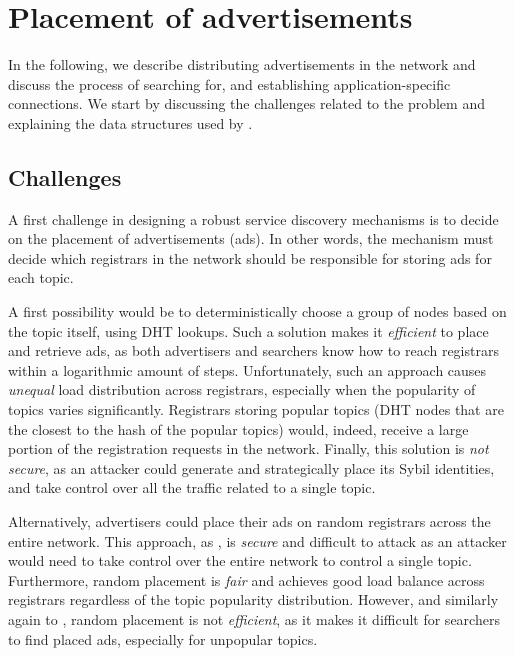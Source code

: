 
\section{Placement of advertisements}
\label{sec:placement}

In the following, we describe distributing advertisements in the network and discuss the process of searching for, and establishing application-specific connections. We start by discussing the challenges related to the problem and explaining the data structures used by \sysname. 

\subsection{Challenges}


A first challenge in designing a robust service discovery mechanisms is to decide on the placement of advertisements (ads).
In other words, the mechanism must decide which registrars in the network should be responsible for storing ads for each topic.

A first possibility would be to deterministically choose a group of nodes based on the topic itself, using DHT lookups.
Such a solution makes it \emph{efficient} to place and retrieve ads, as both advertisers and searchers know how to reach registrars within a logarithmic amount of steps.
Unfortunately, such an approach causes \emph{unequal} load distribution across registrars, especially when the popularity of topics varies significantly.
Registrars storing popular topics (\ie DHT nodes that are the closest to the hash of the popular topics) would, indeed, receive a large portion of the registration requests in the network. 
Finally, this solution is \emph{not secure}, as an attacker could generate and strategically place its Sybil identities, and take control over all the traffic related to a single topic. 

Alternatively, advertisers could place their ads on random registrars across the entire network. 
This approach, as \discv, is \emph{secure} and difficult to attack as an attacker would need to take control over the entire network to control a single topic.
Furthermore, random placement is \emph{fair} and achieves good load balance across registrars regardless of the topic popularity distribution.
However, and similarly again to \discv, random placement is not \emph{efficient}, as it makes it difficult for searchers to find placed ads, especially for unpopular topics. 

